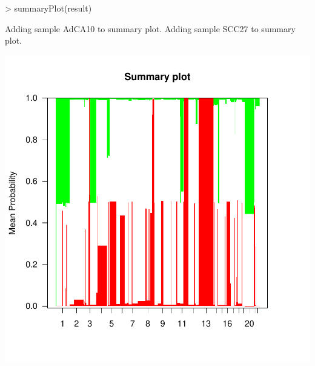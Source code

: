 \documentclass[11pt]{article}
\begin{document}
\begin{center}
\begin{Schunk}
\begin{Sinput}
> summaryPlot(result)
\end{Sinput}
\begin{Soutput}
Adding sample AdCA10 to summary plot.
Adding sample SCC27 to summary plot.
\end{Soutput}
\end{Schunk}
\includegraphics{CGHcall-008}
\end{center}

\pagebreak


\end{document}
